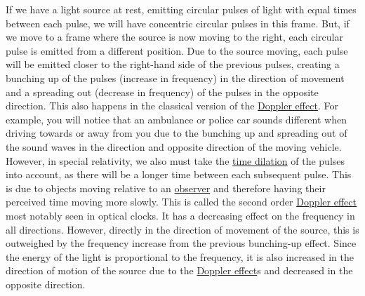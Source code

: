 If we have a light source at rest, emitting circular pulses of light with equal times between each pulse, we will have concentric circular pulses in this frame.
But, if we move to a frame where the source is now moving to the right, each circular pulse is emitted from a different position.
Due to the source moving, each pulse will be emitted closer to the right-hand side of the previous pulses, creating a bunching up of the pulses (increase in frequency) in the direction of movement and a spreading out (decrease in frequency) of the pulses in the opposite direction.
This also happens in the classical version of the \hyperlink{def-doppler-effect}{Doppler effect}.
For example, you will notice that an ambulance or police car sounds different when driving towards or away from you due to the bunching up and spreading out of the sound waves in the direction and opposite direction of the moving vehicle.
However, in special relativity, we also must take the \hyperlink{def-time-dilation}{time dilation} of the pulses into account, as there will be a longer time between each subsequent pulse.
This is due to objects moving relative to an \hyperlink{def-observer}{observer} and therefore having their perceived time moving more slowly.
This is called the second order \hyperlink{def-doppler-effect}{Doppler effect} most notably seen in optical clocks.
It has a decreasing effect on the frequency in all directions.
However, directly in the direction of movement of the source, this is outweighed by the frequency increase from the previous bunching-up effect.
Since the energy of the light is proportional to the frequency, it is also increased in the direction of motion of the source due to the \hyperlink{def-doppler-effect}{Doppler effect}s and decreased in the opposite direction.


